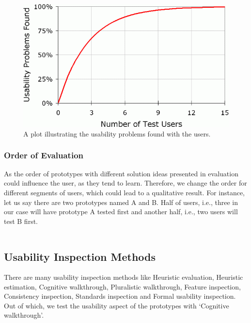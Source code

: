 \begin{figure}[hbt!]
	\centering
	\includegraphics[width=\linewidth]{figures/fiveplot}
	\caption{A plot illustrating the usability problems found with the users.\cite{5users}}
	\label{fig:5plot}
\end{figure}

\subsubsection{Order of Evaluation}

As the order of prototypes with different solution ideas presented in evaluation could influence the user, as they tend to learn. Therefore, we change the order for different segments of users, which could lead to a qualitative result. For instance, let us say there are two prototypes named A and B. Half of users, i.e., three in our case will have prototype A tested first and another half, i.e., two users will test B first. \\ \\

\subsection{Usability Inspection Methods}

There are many usability inspection methods \cite{nielsen1994usability} like Heuristic evaluation, Heuristic estimation, Cognitive walkthrough, Pluralistic walkthrough, Feature inspection, Consistency inspection, Standards inspection and Formal usability inspection. Out of which, we test the usability aspect of the prototypes with ‘Cognitive walkthrough’. \\ \\

